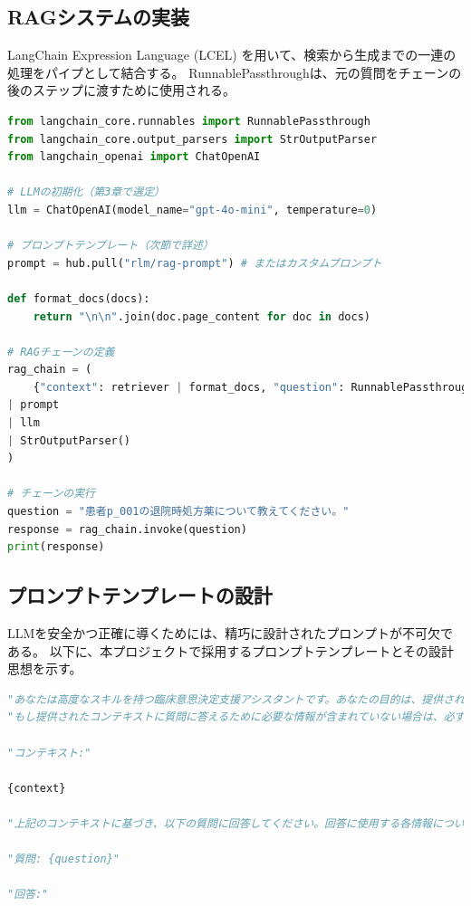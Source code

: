 \documentclass[12pt,a4paper]{jsarticle}
\begin{document}
\subsection{RAGシステムの実装}
LangChain Expression Language (LCEL) を用いて、検索から生成までの一連の処理をパイプとして結合する。
RunnablePassthroughは、元の質問をチェーンの後のステップに渡すために使用される。
\begin{lstlisting}[language=Python, label=lst:rag_chain, caption=RAGチェーンの構築]
from langchain_core.runnables import RunnablePassthrough
from langchain_core.output_parsers import StrOutputParser
from langchain_openai import ChatOpenAI

# LLMの初期化（第3章で選定）
llm = ChatOpenAI(model_name="gpt-4o-mini", temperature=0)

# プロンプトテンプレート（次節で詳述）
prompt = hub.pull("rlm/rag-prompt") # またはカスタムプロンプト

def format_docs(docs):
    return "\n\n".join(doc.page_content for doc in docs)

# RAGチェーンの定義
rag_chain = (
    {"context": retriever | format_docs, "question": RunnablePassthrough()}
| prompt
| llm
| StrOutputParser()
)

# チェーンの実行
question = "患者p_001の退院時処方薬について教えてください。"
response = rag_chain.invoke(question)
print(response)
\end{lstlisting}

\subsection{プロンプトテンプレートの設計}
LLMを安全かつ正確に導くためには、精巧に設計されたプロンプトが不可欠である。
以下に、本プロジェクトで採用するプロンプトテンプレートとその設計思想を示す。

\begin{lstlisting}[language=Python, label=lst:rag_prompt, caption=RAGプロンプトテンプレート]
"あなたは高度なスキルを持つ臨床意思決定支援アシスタントです。あなたの目的は、提供された患者の電子カルテのコンテキストに「のみ」基づいて、質問に正確に回答することです。あなた自身の内部知識は一切使用しないでください。"
"もし提供されたコンテキストに質問に答えるために必要な情報が含まれていない場合は、必ず「提供されたコンテキストには、この質問に回答するための十分な情報が含まれていません。」と回答してください。存在しない情報を推測したり、推論したりしようとしないでください。"

"コンテキスト:"

{context}

"上記のコンテキストに基づき、以下の質問に回答してください。回答に使用する各情報について、具体的なソース文書とセクションを引用してください。"

"質問: {question}"

"回答:"
\end{lstlisting}


\end{document}
